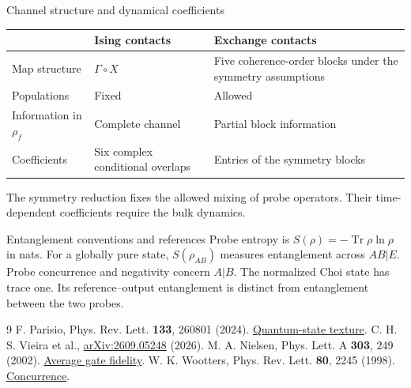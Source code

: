 \documentclass[aspectratio=169,11pt]{beamer}
\newcommand{\Tr}{\operatorname{Tr}}
\begin{document}
\begin{frame}{Channel structure and dynamical coefficients}
\begin{center}
\small
\begin{tabular}{@{}p{2.5cm}p{4.7cm}p{5.2cm}@{}}
\toprule
&Ising contacts&Exchange contacts\\\midrule
Map structure&$\Gamma\circ X$&Five coherence-order blocks under the symmetry assumptions\\[5pt]
Populations&Fixed&Allowed\\[5pt]
Information in $\rho_f$&Complete channel&Partial block information\\[5pt]
Coefficients&Six complex conditional overlaps&Entries of the symmetry blocks\\\bottomrule
\end{tabular}
\end{center}
\medskip
The symmetry reduction fixes the allowed mixing of probe operators.
Their time-dependent coefficients require the bulk dynamics.
\end{frame}

\begin{frame}{Entanglement conventions and references}
\small
Probe entropy is $S(\rho)=-\Tr\rho\ln\rho$ in nats.
For a globally pure state, $S(\rho_{AB})$ measures entanglement across
$AB|E$. Probe concurrence and negativity concern $A|B$.
\medskip
The normalized Choi state has trace one. Its reference--output
entanglement is distinct from entanglement between the two probes.
\medskip
\begin{thebibliography}{9}
 F. Parisio, Phys. Rev. Lett. \textbf{133}, 260801 (2024).
\href{https://doi.org/10.1103/PhysRevLett.133.260801}{Quantum-state texture}.
 C. H. S. Vieira et al.,
\href{https://arxiv.org/abs/2609.05248}{arXiv:2609.05248} (2026).
 M. A. Nielsen, Phys. Lett. A \textbf{303}, 249 (2002).
\href{https://arxiv.org/abs/quant-ph/0205035}{Average gate fidelity}.
 W. K. Wootters, Phys. Rev. Lett. \textbf{80}, 2245 (1998).
\href{https://doi.org/10.1103/PhysRevLett.80.2245}{Concurrence}.
\end{thebibliography}
\end{frame}
\end{document}
